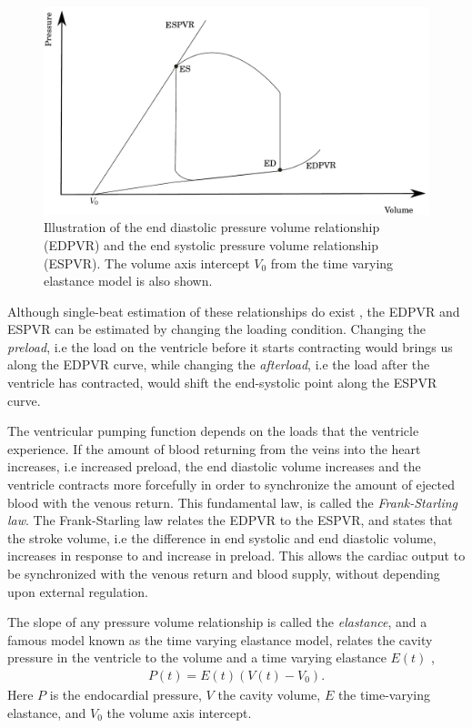 \begin{figure}[htbp]
  \centering
    \includegraphics{chapters/introduction/figures/pvr}
\caption{Illustration of the end diastolic pressure volume
  relationship (EDPVR) and the end systolic pressure volume
  relationship (ESPVR). The volume axis intercept $V_0$ from the time
  varying elastance model is also shown. }
\label{fig:intro_pvr}
\end{figure}




Although single-beat estimation of these relationships do
exist \cite{senzaki1996single,klotz2006single}, the EDPVR and ESPVR
can be estimated by changing the loading condition.
Changing the \emph{preload}, i.e the load on the ventricle
before it starts contracting would brings us along the EDPVR
curve, while changing the \emph{afterload}, i.e the load after
the ventricle has contracted, would shift the end-systolic point along
the ESPVR curve.


The ventricular pumping function depends on the loads that the
ventricle experience. If the amount of blood returning from the veins
into the heart increases, i.e increased preload, the end diastolic
volume increases and the ventricle contracts more forcefully in order
to synchronize the amount of ejected blood with the venous
return. This fundamental law, is called the \emph{Frank-Starling
  law}. The Frank-Starling law relates the EDPVR to the ESPVR, and
states that the stroke volume, i.e the difference in end systolic and
end diastolic volume, increases in response to and increase in
preload. This allows the cardiac output to
be synchronized with the venous return and blood supply, without
depending upon external regulation. 


The slope of any pressure volume relationship is called the \emph{elastance},
and a famous model known as the  time varying elastance model, relates
the cavity pressure in the ventricle to the volume and a time varying elastance $E(t)$
\cite{sagawa1977end},  
\begin{align}
  P(t) = E(t)( V(t) - V_0 ).
  \label{eq:time_varying_elastance}
\end{align}
Here $P$ is the endocardial pressure, $V$ the cavity volume, $E$ the
time-varying elastance, and $V_0$ the volume axis intercept.

